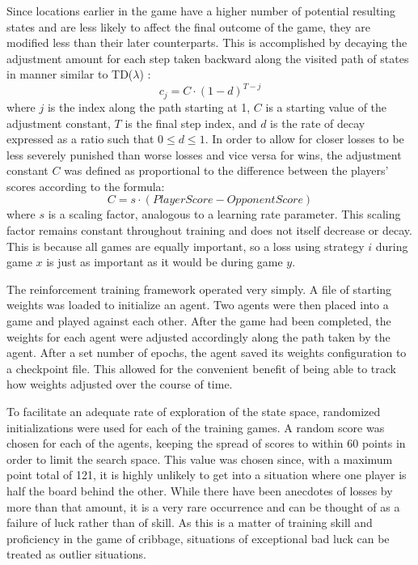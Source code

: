 Since locations earlier in the game have a higher number of potential resulting
states and are less likely to affect the final outcome of the game,
they are modified less than their later counterparts.
%
This is accomplished by decaying the adjustment amount for each step taken
backward along the visited path of states in manner similar to TD($\lambda$)
\cite{tdgammon}:
\[
	c_j = C \cdot (1 - d)^{T-j}
\]
where $j$ is the index along the path starting at 1,
$C$ is a starting value of the adjustment constant,
$T$ is the final step index,
and $d$ is the rate of decay expressed as a ratio such that $0 \leq d \leq 1$.
%
In order to allow for closer losses to be less severely punished than worse
losses and vice versa for wins,
the adjustment constant $C$ was defined as proportional to the difference
between the players' scores according to the formula:
\[
	C = s \cdot \left({PlayerScore} - {OpponentScore}\right) 
\]
where $s$ is a scaling factor,
analogous to a learning rate parameter.
%
This scaling factor remains constant throughout training
and does not itself decrease or decay.
%
This is because all games are equally important,
so a loss using strategy $i$ during game $x$ is just as important as
it would be during game $y$.

The reinforcement training framework operated very simply.
%
A file of starting weights was loaded to initialize an agent.
%
Two agents were then placed into a game and played against each other.
%
After the game had been completed,
the weights for each agent were adjusted
accordingly along the path taken by the agent.
%
After a set number of epochs, the agent saved its weights configuration to a
checkpoint file.
%
This allowed for the convenient benefit of being able to track how weights
adjusted over the course of time.

To facilitate an adequate rate of exploration of the state space,
randomized initializations were used for each of the training games.
%
A random score was chosen for each of the agents,
keeping the spread of scores to within 60 points
in order to limit the search space.
%
This value was chosen since,
with a maximum point total of 121,
it is highly unlikely to get into a situation where one player is half the board
behind the other.
%
While there have been anecdotes of losses by more than that amount,
it is a very rare occurrence and can be thought of as a failure of luck
rather than of skill.
%
As this is a matter of training skill and proficiency in the game of cribbage,
situations of exceptional bad luck can be treated as outlier situations.

